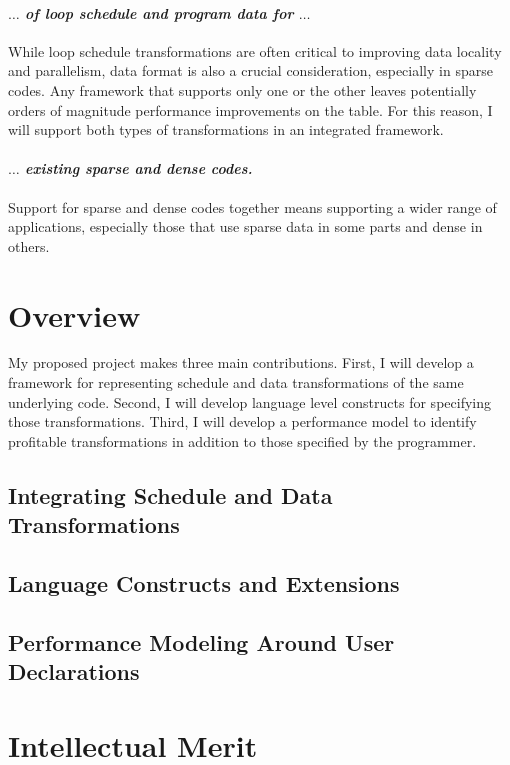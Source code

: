 \documentclass{article}
\begin{document}
\paragraph{$\dots$ \textit{of loop schedule and program data for} $\dots$}
While loop schedule transformations are often critical to improving data locality and parallelism, data format is also a crucial consideration, especially in sparse codes. 
Any framework that supports only one or the other leaves potentially orders of magnitude performance improvements on the table.
For this reason, I will support both types of transformations in an integrated framework.
\paragraph{$\dots$ \textit{existing sparse and dense codes.}}
Support for sparse and dense codes together means supporting a wider range of applications, especially those that use sparse data in some parts and dense in others.

\section{Overview}

My proposed project makes three main contributions.
First, I will develop a framework for representing schedule and data transformations of the same underlying code. 
Second, I will develop language level constructs for specifying those transformations.
Third, I will develop a performance model to identify profitable transformations in addition to those specified by the programmer.

\subsection{Integrating Schedule and Data Transformations}

\subsection{Language Constructs and Extensions}

\subsection{Performance Modeling Around User Declarations}

\section{Intellectual Merit}
\end{document}
